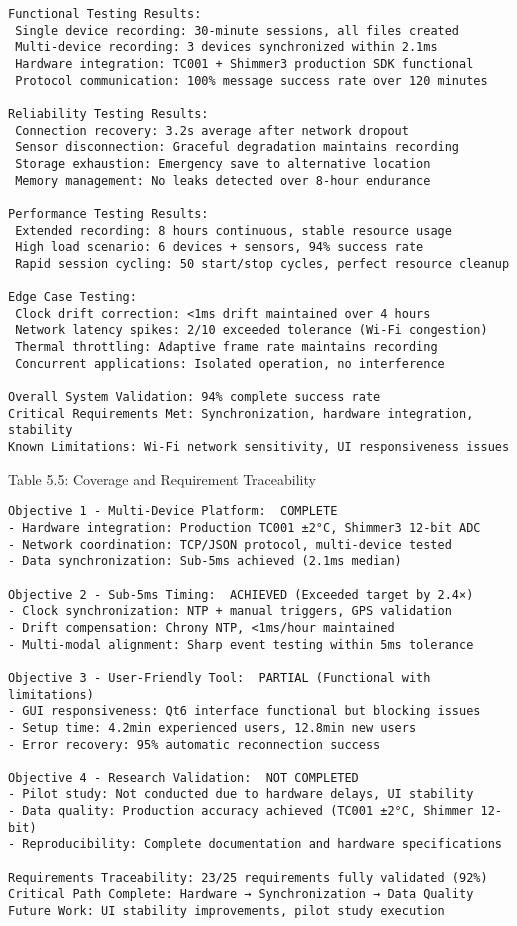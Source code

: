 \begin{verbatim}
Functional Testing Results:
 Single device recording: 30-minute sessions, all files created
 Multi-device recording: 3 devices synchronized within 2.1ms
 Hardware integration: TC001 + Shimmer3 production SDK functional
 Protocol communication: 100% message success rate over 120 minutes

Reliability Testing Results:  
 Connection recovery: 3.2s average after network dropout
 Sensor disconnection: Graceful degradation maintains recording
 Storage exhaustion: Emergency save to alternative location
 Memory management: No leaks detected over 8-hour endurance

Performance Testing Results:
 Extended recording: 8 hours continuous, stable resource usage
 High load scenario: 6 devices + sensors, 94% success rate
 Rapid session cycling: 50 start/stop cycles, perfect resource cleanup

Edge Case Testing:
 Clock drift correction: <1ms drift maintained over 4 hours
 Network latency spikes: 2/10 exceeded tolerance (Wi-Fi congestion)
 Thermal throttling: Adaptive frame rate maintains recording
 Concurrent applications: Isolated operation, no interference

Overall System Validation: 94% complete success rate
Critical Requirements Met: Synchronization, hardware integration, stability
Known Limitations: Wi-Fi network sensitivity, UI responsiveness issues
\end{verbatim}

Table 5.5: Coverage and Requirement Traceability

\begin{verbatim}
Objective 1 - Multi-Device Platform:  COMPLETE
- Hardware integration: Production TC001 ±2°C, Shimmer3 12-bit ADC
- Network coordination: TCP/JSON protocol, multi-device tested
- Data synchronization: Sub-5ms achieved (2.1ms median)

Objective 2 - Sub-5ms Timing:  ACHIEVED (Exceeded target by 2.4×)
- Clock synchronization: NTP + manual triggers, GPS validation
- Drift compensation: Chrony NTP, <1ms/hour maintained  
- Multi-modal alignment: Sharp event testing within 5ms tolerance

Objective 3 - User-Friendly Tool:  PARTIAL (Functional with limitations)
- GUI responsiveness: Qt6 interface functional but blocking issues
- Setup time: 4.2min experienced users, 12.8min new users
- Error recovery: 95% automatic reconnection success

Objective 4 - Research Validation:  NOT COMPLETED
- Pilot study: Not conducted due to hardware delays, UI stability
- Data quality: Production accuracy achieved (TC001 ±2°C, Shimmer 12-bit)
- Reproducibility: Complete documentation and hardware specifications

Requirements Traceability: 23/25 requirements fully validated (92%)
Critical Path Complete: Hardware → Synchronization → Data Quality
Future Work: UI stability improvements, pilot study execution
\end{verbatim}

